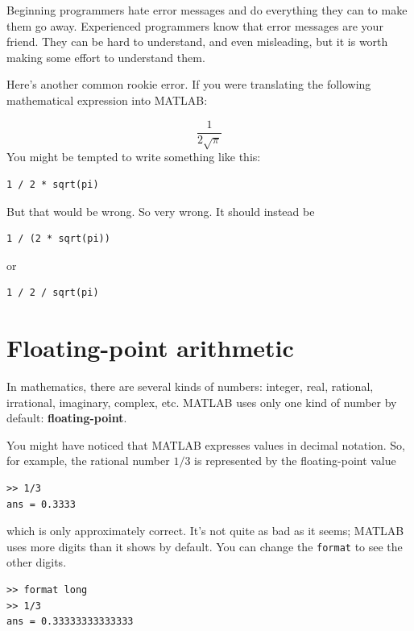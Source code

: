 \documentclass{book}
\begin{document}
Beginning programmers hate error messages and do everything they
can to make them go away.  Experienced programmers know that error
messages are your friend.  They can be hard to understand, and even
misleading, but it is worth making some effort to understand them.

Here's another common rookie error.  If you were translating
the following mathematical
expression into MATLAB:

\begin{equation}
 \frac{1}{2 \sqrt \pi}
\end{equation}
You might be tempted to write something like this:

\begin{verbatim}
1 / 2 * sqrt(pi)
\end{verbatim}

But that would be wrong.  So very wrong.  It should instead be

\begin{verbatim}
1 / (2 * sqrt(pi))
\end{verbatim}

or

\begin{verbatim}
1 / 2 / sqrt(pi)
\end{verbatim}


\section{Floating-point arithmetic}

In mathematics, there are several kinds of numbers: integer, real,
rational, irrational, imaginary, complex, etc.  MATLAB uses only one
kind of number by default: {\bf floating-point}.

You might have noticed that MATLAB expresses values in decimal
notation.  So, for example, the rational number $1/3$ is represented
by the floating-point value

\begin{verbatim}
>> 1/3
ans = 0.3333
\end{verbatim}

which is only approximately correct.  It's not quite as bad as
it seems; MATLAB uses more digits than it shows by default.
You can change the {\tt format} to see the other digits.

\begin{verbatim}
>> format long
>> 1/3
ans = 0.33333333333333
\end{verbatim}
\end{document}
